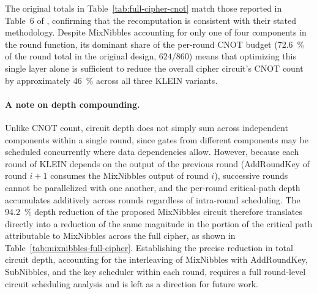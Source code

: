 \begin{table}[htbp]
\centering
{}
\caption{Full-cipher CNOT count with the proposed MixNibbles circuit substituted into the round structure of \cite{cryptoeprint:2026/1007}.}
\label{tab:full-cipher-cnot}
\end{table}

The original totals in Table~\ref{tab:full-cipher-cnot} match those reported in
Table~6 of \cite{cryptoeprint:2026/1007}, confirming that the recomputation is consistent with
their stated methodology. Despite MixNibbles accounting for only one of four components in
the round function, its dominant share of the per-round CNOT budget (\SI{72.6}{\percent} of
the round total in the original design, $624/860$) means that optimizing this single layer
alone is sufficient to reduce the overall cipher circuit's CNOT count by approximately
\SI{46}{\percent} across all three KLEIN variants.

\paragraph{A note on depth compounding.}
Unlike CNOT count, circuit depth does not simply sum across independent components within a
single round, since gates from different components may be scheduled concurrently where data
dependencies allow. However, because each round of KLEIN depends on the output of the
previous round (AddRoundKey of round $i+1$ consumes the MixNibbles output of round $i$),
successive rounds cannot be parallelized with one another, and the per-round critical-path
depth accumulates additively across rounds regardless of intra-round scheduling. The
\SI{94.2}{\percent} depth reduction of the proposed MixNibbles circuit therefore translates
directly into a reduction of the same magnitude in the portion of the critical path
attributable to MixNibbles across the full cipher, as shown in
Table~\ref{tab:mixnibbles-full-cipher}. Establishing the precise reduction in total
circuit depth, accounting for the interleaving of MixNibbles with AddRoundKey, SubNibbles,
and the key scheduler within each round, requires a full round-level circuit scheduling
analysis and is left as a direction for future work.

